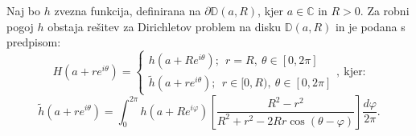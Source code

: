 \documentclass[mat1]{fmfdelo}
\begin{document}
    \begin{trditev}
        \label{alldisk}
        Naj bo $h$ zvezna funkcija, definirana na $\partial \mathbb{D}(a,R)$, kjer $a \in \mathbb{C}$ in $R>0$.  
        Za robni pogoj $h$ obstaja rešitev za Dirichletov problem na disku $\mathbb{D}(a,R)$ in je podana s predpisom:
        $$
            H(a + r e^{i \theta}) = \begin{cases}
                    h(a + R e^{i \theta});~~r = R,~\theta \in [0, 2\pi]\\
                    \widetilde{h}(a + r e^{i \theta});~~ r \in [0,R),~ \theta \in [0, 2\pi]
            \end{cases},~\text{kjer:}
        $$
        $$
        \widetilde{h}(a + r e^{i \theta}) = \int_{0}^{2 \pi}{h(a + R e^{i \varphi}) \left[\frac{R^2 - r^2}{R^2 + r^2 - 2Rr \cos(\theta - \varphi)}\right] \frac{d \varphi}{2 \pi}}.
        $$
     \end{trditev}
\end{document}
